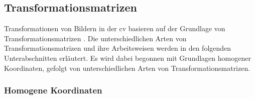 
\subsection{Transformationsmatrizen}
\label{sec:transformations_matrizen}

Transformationen von Bildern in der \ac{cv} basieren auf der Grundlage von Transformationsmatrizen \cite{transformationen_1,transformationen_2,cv_general}. Die unterschiedlichen Arten von Transformationsmatrizen und ihre Arbeitsweisen werden in den folgenden Unterabschnitten erläutert. Es wird dabei begonnen mit Grundlagen homogener Koordinaten, gefolgt von unterschiedlichen Arten von Transformationsmatrizen.

\subsubsection{Homogene Koordinaten}
\label{sec:homogene_koordinaten}

